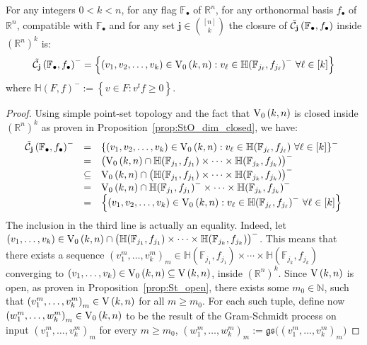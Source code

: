 \begin{lemma}\label{lem:closure_of_cells} For any integers $0<k<n$, for any flag $\mathbb{F}_{\bullet}$ of $\mathbb{R}^n$, for any orthonormal basis $f_{\bullet}$ of $\mathbb{R}^n$, compatible with $\mathbb{F}_{\bullet}$ and for any set $\mathbf{j}\in\binom{[n]}{k}$ the closure of $\tilde{\mathcal{C}}_{\mathbf{j}}\left(\mathbb{F}_{\bullet},f_{\bullet}\right)$ inside ${\left(\mathbb{R}^n\right)}^k$ is:
\[\stcell{j}^-=\left\{(v_1,v_2,\ldots,v_k)\in\StO{k}{n}:v_{\ell}\in{\mathbb{H}(\mathbb{F}_{j_{\ell}},f_{j_{\ell}})}^-\ \forall\ell\in[k]\right\}\]
where
${\mathbb{H}(F,f)}^-:=\left\{v\in F:v^tf\geq 0\right\}$.
\end{lemma}
\begin{proof} Using simple point-set topology and the fact that $\StO{k}{n}$ is closed inside ${\left(\mathbb{R}^n\right)}^k$ as proven in Proposition~\ref{prop:StO_dim_closed}, we have:
\[\begin{array}{rcl}\stcell{j}^-
&=&{\left\{(v_1,v_2,\ldots,v_k)\in\StO{k}{n}:v_{\ell}\in\mathbb{H}(\mathbb{F}_{j_{\ell}},f_{j_{\ell}})\ \forall\ell\in[k]\right\}}^-\\
&=&{\big(\StO{k}{n}\cap\mathbb{H}(\mathbb{F}_{j_1},f_{j_1})\times\cdots\times\mathbb{H}(\mathbb{F}_{j_k},f_{j_k})\big)}^-\\
&\subseteq&\StO{k}{n}\cap{\big(\mathbb{H}(\mathbb{F}_{j_1},f_{j_1})\times\cdots\times\mathbb{H}(\mathbb{F}_{j_k},f_{j_k})\big)}^-\\
&=&\StO{k}{n}\cap\mathbb{H}{\left(\mathbb{F}_{j_1},f_{j_1}\right)}^-\times\cdots\times\mathbb{H}{\left(\mathbb{F}_{j_k},f_{j_k}\right)}^-\\
&=&\left\{(v_1,v_2,\ldots,v_k)\in\StO{k}{n}:v_{\ell}\in{\mathbb{H}(\mathbb{F}_{j_{\ell}},f_{j_{\ell}})}^-\ \forall\ell\in[k]\right\}\\
\end{array}\]
The inclusion in the third line is actually an equality. Indeed, let $(v_1,\ldots,v_k)\in\StO{k}{n}\cap{\big(\mathbb{H}(\mathbb{F}_{j_1},f_{j_1})\times\cdots\times\mathbb{H}(\mathbb{F}_{j_k},f_{j_k})\big)}^-$. This means that there exists a sequence ${(v_1^m,\ldots,v_k^m)}_m\in\mathbb{H}(\mathbb{F}_{j_1},f_{j_1})\times\cdots\times\mathbb{H}(\mathbb{F}_{j_k},f_{j_k})$ converging to $(v_1,\ldots,v_k)\in\StO{k}{n}\subseteq\St{k}{n}$, inside ${\left(\mathbb{R}^n\right)}^k$. Since $\St{k}{n}$ is open, as proven in Proposition~\ref{prop:St_open}, there exists some $m_0\in\mathbb{N}$, such that ${(v_1^m,\ldots,v_k^m)}_m\in\St{k}{n}$ for all $m\geq m_0$. For each such tuple, define now ${(w_1^m,\ldots,w_k^m)}_m\in\StO{k}{n}$ to be the result of the Gram-Schmidt process on input ${(v_1^m,\ldots,v_k^m)}_m$ for every $m\geq m_0$,
${(w_1^m,\ldots,w_k^m)}_m:=\mathfrak{gs}\big({(v_1^m,\ldots,v_k^m)}_m\big)$


\end{proof}
